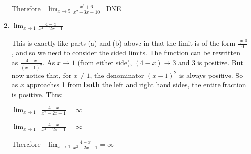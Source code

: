 \documentclass[handout,nooutcomes]{ximera}
\begin{document}
\begin{problem}
\begin{enumerate}
\begin{freeResponse}
		Therefore \, $ \lim_{x \to 5} \frac{x^2 + 6}{x^2 - 3x - 10}$ \, DNE
		\end{freeResponse}		
	
	
			
	\item  $\lim_{x \to 1} \frac{4-x}{x^2 - 2x + 1}   $
		\begin{freeResponse}
		This is exactly like parts (a) and (b) above in that the limit is of the form $\frac{\neq 0}{0}$, and so we need to consider the sided limits.  The function can be rewritten as $\frac{4-x}{(x-1)^2}$.  As $x \to 1$ (from either side), $(4-x) \to 3$ and 3 is positive.  But now notice that, for $x \neq 1$, the denominator $(x-1)^2$ is always positive.  So as $x$ approaches 1 from \textbf{both} the left and right hand sides, the entire fraction is positive.  Thus:
		
		$ \lim_{x \to 1^-} \frac{4-x}{x^2 - 2x + 1} = \infty$
		
		$ \lim_{x \to 1^+} \frac{4-x}{x^2 - 2x + 1} = \infty$
		
		Therefore \, $ \lim_{x \to 1} \frac{4-x}{x^2 - 2x + 1} = \infty$  
		\end{freeResponse}
		
			
	\end{enumerate}
\end{problem}
			
			
			
\end{document}
